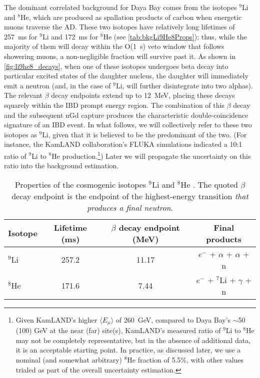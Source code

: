 \documentclass[../thesis.tex]{subfiles}
\begin{document}
The dominant correlated background for Daya Bay comes from the isotopes $^9$Li and $^8$He, which are produced as spallation products of carbon when energetic muons traverse the AD. These two isotopes have relatively long lifetimes of 257~ms for $^9$Li and 172~ms for $^8$He \cite{ENDF} (see \autoref{tab:bkgLi9He8Props}); thus, while the majority of them will decay within the O(1~s) veto window that follows showering muons, a non-negligible fraction will survive past it. As shown in \autoref{fig:li9he8_decays}, when one of these isotopes undergoes beta decay into particular excited states of the daughter nucleus, the daughter will immediately emit a neutron (and, in the case of $^9$Li, will further disintegrate into two alphas). The relevant $\beta$ decay endpoints extend up to 12~MeV, placing these decays squarely within the IBD prompt energy region. The combination of this $\beta$ decay and the subsequent nGd capture produces the characteristic double-coincidence signature of an IBD event. In what follows, we will collectively refer to these two isotopes as $^9$Li, given that it is believed to be the predominant of the two. (For instance, the KamLAND collaboration's FLUKA simulations \cite{KamLAND_cosmo} indicated a 10:1 ratio of $^9$Li to $^8$He production.\label{par:kamland_he8}\footnote{Given KamLAND's higher $\langle E_\mu \rangle$ of 260~GeV, compared to Daya Bay's $\sim$50 (100) GeV at the near (far) site(s), KamLAND's measured ratio of $^9$Li to $^8$He may not be completely representative, but in the absence of additional data, it is an acceptable starting point. In practice, as discussed later, we use a nominal (and somewhat arbitrary) $^8$He fraction of 5.5\%, with other values trialed as part of the overall uncertainty estimation.}) Later we will propagate the uncertainty on this ratio into the background estimation. 

\begin{table}[h]
  \begin{tabular}{lccc}
    \toprule
    Isotope & Lifetime (ms) & $\beta$ decay endpoint (MeV) & Final products \\
    \midrule
    $^9$Li & 257.2 & 11.17 & $e^-$ + $\alpha$ + $\alpha$ + n \\
    $^8$He & 171.6 & 7.44 & $e^-$ + $^7$Li  + $\gamma$ + n \\
    \bottomrule
  \end{tabular}
  \caption{Properties of the cosmogenic isotopes $^9$Li and $^8$He \cite{ENDF}. The quoted $\beta$ decay endpoint is the endpoint of the highest-energy transition \emph{that produces a final neutron}.}
  \label{tab:bkgLi9He8Props}
\end{table}
\end{document}
